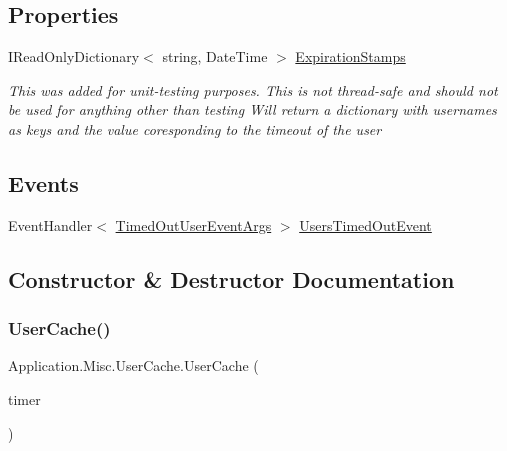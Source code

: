 \subsection*{Properties}
\begin{DoxyCompactItemize}
\item 
I\+Read\+Only\+Dictionary$<$ string, Date\+Time $>$ \mbox{\hyperlink{class_application_1_1_misc_1_1_user_cache_ad5b655841c5a15022a372cfe9fb6960d}{Expiration\+Stamps}}
\begin{DoxyCompactList}\small\item\em This was added for unit-\/testing purposes. This is not thread-\/safe and should not be used for anything other than testing Will return a dictionary with usernames as keys and the value coresponding to the timeout of the user \end{DoxyCompactList}\end{DoxyCompactItemize}
\subsection*{Events}
\begin{DoxyCompactItemize}
\item 
Event\+Handler$<$ \mbox{\hyperlink{class_application_1_1_interfaces_1_1_timed_out_user_event_args}{Timed\+Out\+User\+Event\+Args}} $>$ \mbox{\hyperlink{class_application_1_1_misc_1_1_user_cache_aac04127fb652a14238e2742d0bba6558}{Users\+Timed\+Out\+Event}}
\end{DoxyCompactItemize}


\subsection{Constructor \& Destructor Documentation}
\mbox{\label{class_application_1_1_misc_1_1_user_cache_ab52d91840d3b6c3d4162992b35bbf3a5}} 
\subsubsection{\texorpdfstring{User\+Cache()}{UserCache()}}
{\footnotesize\ttfamily Application.\+Misc.\+User\+Cache.\+User\+Cache (\begin{DoxyParamCaption}\item[{\mbox{\hyperlink{interface_application_1_1_interfaces_1_1_i_timer}{I\+Timer}}}]{timer }\end{DoxyParamCaption})}



